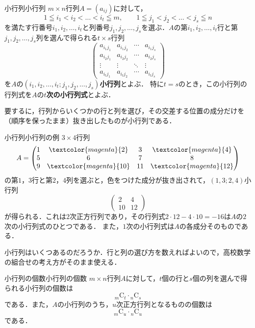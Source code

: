 \begin{definition}{小行列}{小行列}
  $m \times n$行列$A=(a_{ij})$に対して，
  \[
  1 \leqq i_1 < i_2 < \dots < i_t \leqq m,
  \qquad
  1 \leqq j_1 < j_2 < \dots < j_s \leqq n
  \]
  を満たす行番号$i_1,i_2,\dots,i_t$と列番号$j_1,j_2,\dots,j_s$を選ぶ．$A$の第$i_1,i_2,\dots,i_t$行と第$j_1,j_2,\dots,j_s$列を選んで得られる$t \times s$行列
  \[
  \begin{pmatrix}
  a_{i_1 j_1} & a_{i_1 j_2} & \cdots & a_{i_1 j_s} \\
  a_{i_2 j_1} & a_{i_2 j_2} & \cdots & a_{i_2 j_s} \\
  \vdots      & \vdots      & \ddots & \vdots      \\
  a_{i_t j_1} & a_{i_t j_2} & \cdots & a_{i_t j_s}
  \end{pmatrix}
  \]
  を$A$の\textbf{$(i_1,i_2,\dots,i_t ; j_1,j_2,\dots,j_s)$小行列}とよぶ．
  特に$t=s$のとき，この小行列の行列式を$A$の\textbf{$t$次の小行列式}とよぶ．
\end{definition}

要するに，行列からいくつかの行と列を選び，その交差する位置の成分だけを（順序を保ったまま）抜き出したものが小行列である．

\begin{example}{小行列}{小行列の例}
  $3 \times 4$行列
  \[
    A = \begin{pmatrix}
      1 & \textcolor{magenta}{2} & 3 & \textcolor{magenta}{4} \\
      5 & 6 & 7 & 8 \\
      9 & \textcolor{magenta}{10} & 11 & \textcolor{magenta}{12}
    \end{pmatrix}
  \]
  の第$1$，$3$行と第$2$，$4$列を選ぶと，色をつけた成分が抜き出されて，$(1, 3 ; 2, 4)$小行列
  \[
    \begin{pmatrix} 2 & 4 \\ 10 & 12 \end{pmatrix}
  \]
  が得られる．これは$2$次正方行列であり，その行列式$2 \cdot 12 - 4 \cdot 10 = -16$は$A$の$2$次の小行列式のひとつである．
  また，$1$次の小行列式は$A$の各成分そのものである．
\end{example}

小行列はいくつあるのだろうか．行と列の選び方を数えればよいので，高校数学の組合せの考え方がそのまま使える．

\begin{prop}{小行列の個数}{小行列の個数}
  $m \times n$行列$A$に対して，$t$個の行と$s$個の列を選んで得られる小行列の個数は
  \[
  {}_m \mathrm{C}_t \cdot {}_n \mathrm{C}_s
  \]
  である．また，$A$の小行列のうち，$u$次正方行列となるものの個数は
  \[
  {}_m \mathrm{C}_u \cdot {}_n \mathrm{C}_u
  \]
  である．
\end{prop}

